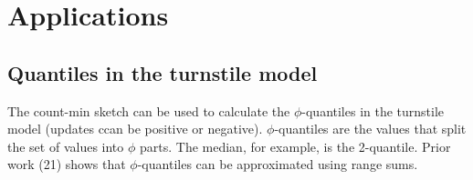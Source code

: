 \documentclass[11pt]{article}
\begin{document}
\section{Applications}

\subsection{Quantiles in the turnstile model}
The count-min sketch can be used to calculate the $\phi$-quantiles in the turnstile model (updates
ccan be positive or negative). $\phi$-quantiles are the values that split the set of values into
$\phi$ parts.  The median, for example, is the 2-quantile. Prior work (21) shows that
$\phi$-quantiles can be approximated using range sums. 


\end{document}
